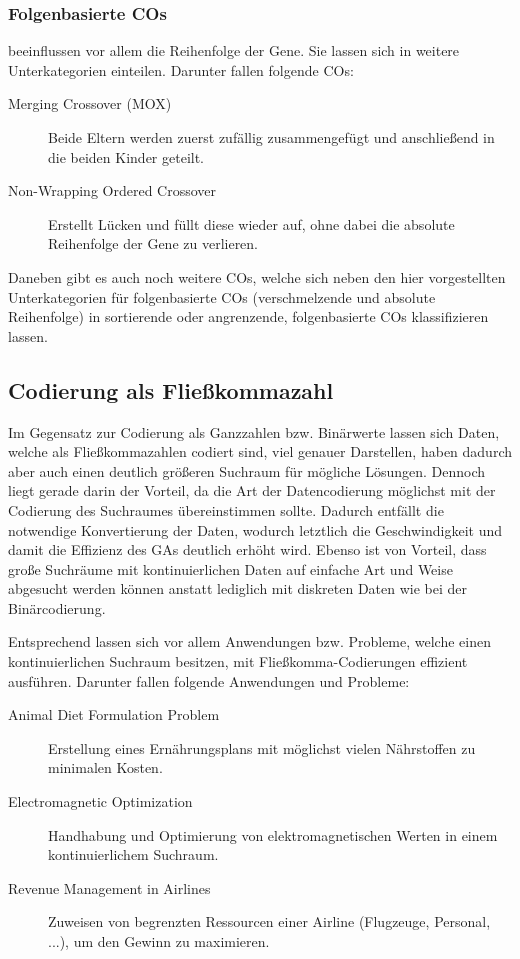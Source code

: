 	\subsubsection{Folgenbasierte COs}
	
		beeinflussen vor allem die Reihenfolge der Gene. Sie lassen sich in weitere Unterkategorien einteilen. Darunter fallen \zB folgende COs:
		
		\begin{description}
			\item[Merging Crossover (MOX)] Beide Eltern werden zuerst zufällig zu\-sam\-men\-ge\-fügt und anschließend in die beiden Kinder geteilt. \cite{OrderBasedForGCP}
			\item[Non-Wrapping Ordered Crossover] Erstellt Lücken und füllt diese wieder auf, ohne dabei die absolute Reihenfolge der Gene zu verlieren. \cite{GAforTSP}
		\end{description}
	
		Daneben gibt es auch noch weitere COs, welche sich neben den hier vorgestellten Unterkategorien für folgenbasierte COs (verschmelzende und absolute Reihenfolge) in \zB  sor\-tier\-ende oder angrenzende, folgenbasierte COs klassifizieren lassen.


\subsection{Codierung als Fließkommazahl}
\label{sec:FloatCod}

	Im Gegensatz zur Codierung als Ganzzahlen bzw. Binärwerte lassen sich Daten, welche als Fließkommazahlen codiert sind, viel genauer Darstellen, haben da\-durch aber auch einen deutlich größeren Suchraum für mögliche Lösungen. Dennoch liegt gerade darin der Vorteil, da die Art der Datencodierung möglichst mit der Codierung des Suchraumes übereinstimmen sollte. Dadurch entfällt die notwendige Konvertierung der Daten, wodurch letztlich die Geschwindigkeit und damit die Effizienz des GAs deutlich erhöht wird. Ebenso ist von Vorteil, dass große Suchräume mit kontinuierlichen Daten auf einfache Art und Weise abgesucht werden können anstatt lediglich mit diskreten Daten wie bei der Binärcodierung. \cite{TacklingRealCodedGA}
	
	Entsprechend lassen sich vor allem Anwendungen bzw. Probleme, welche einen kontinuierlichen Suchraum besitzen, mit Fließkomma-Codierungen effizient ausführen. Darunter fallen \zB folgende Anwendungen und Probleme:
	
	\begin{description}
		\item[Animal Diet Formulation Problem] Erstellung eines Ernährungsplans mit möglichst vielen Nährstoffen zu minimalen Kosten. \cite{ConceptOfCOInRealCoded}
		\item[Electromagnetic Optimization] Handhabung und Optimierung von elektromagnetischen Werten in einem kontinuierlichem Suchraum. \cite{ElectromagneticRealEncoding}
		\item[Revenue Management in Airlines] Zuweisen von begrenzten Ressourcen ei\-ner Airline (Flugzeuge, Personal, ...), um den Gewinn zu maximieren. \cite{AirlineRevenueManagement}
	\end{description}
	
